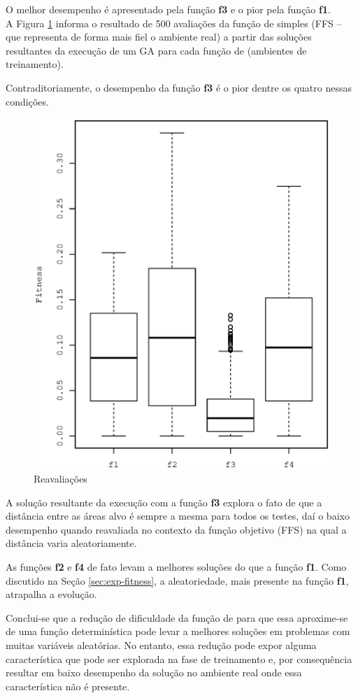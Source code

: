 O melhor desempenho é apresentado pela função \textbf{f3} e o pior pela função \textbf{f1}.\\

A Figura \ref{fig:reeval} informa o resultado de 500 avaliações da função de \fitness simples (FFS -- que representa de forma mais fiel o ambiente real) a partir das soluções resultantes da execução de um GA para cada função de \fitness (ambientes de treinamento).

Contraditoriamente, o desempenho da função \textbf{f3} é o pior dentre os quatro nessas condições.

\begin{figure}[h]
    \centering
    \includegraphics[width=.4\textwidth]{figures/reeval}
    \caption{Reavaliações}
    \label{fig:reeval}
\end{figure}

A solução resultante da execução com a função \textbf{f3} explora o fato de que a distância entre as áreas alvo é sempre a mesma para todos os testes, daí o baixo desempenho quando reavaliada no contexto da função objetivo (FFS) na qual a distância varia aleatoriamente.

As funções \textbf{f2} e \textbf{f4} de fato levam a melhores soluções do que a função \textbf{f1}. Como discutido na Seção \ref{sec:exp-fitness}, a aleatoriedade, mais presente na função \textbf{f1}, atrapalha a evolução.

Conclui-se que a redução de dificuldade da função de \fitness para que essa aproxime-se de uma função determinística pode levar a melhores soluções em problemas com muitas variáveis aleatórias. No entanto, essa redução pode expor alguma característica que pode ser explorada na fase de treinamento e, por consequência resultar em baixo desempenho da solução no ambiente real onde essa característica não é presente.


